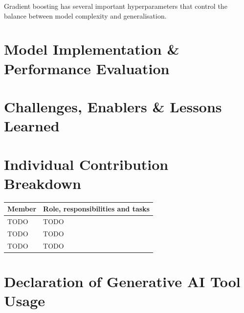 \documentclass[11pt,a4paper]{article}
\begin{document}
\noindent
Gradient boosting has several important hyperparameters that control the balance between model complexity and generalisation.

\section{Model Implementation \& Performance Evaluation}

\section{Challenges, Enablers \& Lessons Learned}

\section{Individual Contribution Breakdown}
\begin{tabular}{@{}lp{10cm}@{}}
\toprule
Member & Role, responsibilities and tasks \\
\midrule
TODO & TODO \\
TODO & TODO \\
TODO & TODO \\
\bottomrule
\end{tabular}

\appendix
\section{Declaration of Generative AI Tool Usage}
\end{document}
